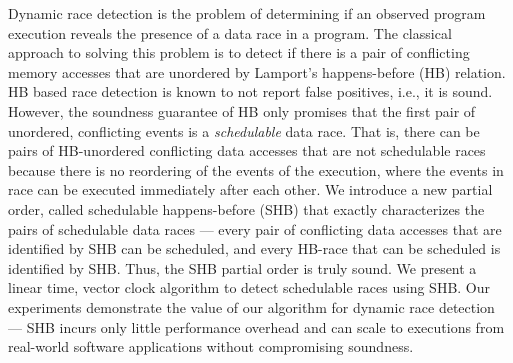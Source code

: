 
Dynamic race detection is the problem of determining if an observed
program execution reveals the presence of a data race in a
program. The classical approach to solving this problem is to detect
if there is a pair of conflicting memory accesses that are unordered
by Lamport's happens-before (HB) relation. 
HB based race detection is known to not report false positives, i.e.,
it is sound.
However, the soundness guarantee of HB only promises 
that the first pair of unordered, conflicting events is a 
\emph{schedulable} data race. That is, there
can be pairs of HB-unordered conflicting data accesses that are
not schedulable races because there is no reordering of
the events of the execution, where the events in race can be executed
immediately after each other. We introduce a new partial order, called
schedulable happens-before (SHB) that exactly characterizes the pairs of
schedulable data races --- every pair of conflicting data accesses
that are identified by SHB can be scheduled, and every HB-race that can be
scheduled is identified by SHB. 
Thus, the SHB partial order is truly sound.
We present
a linear time, vector clock algorithm to detect schedulable races
using SHB. 
Our experiments demonstrate the value of our algorithm for dynamic race
detection --- SHB incurs only little performance overhead and can scale to
executions from real-world software applications without
compromising soundness.